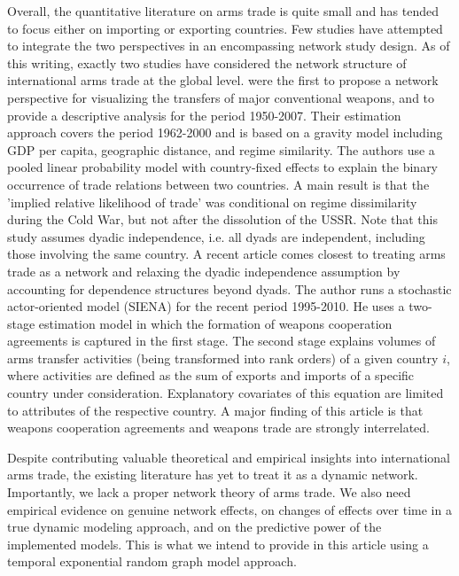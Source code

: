\documentclass[12pt, letterpaper]{article}
\numberwithin{equation}{section}
\begin{document}
Overall, the quantitative literature on arms trade is quite small and has tended to focus either on importing \citep{Pear:89, SmitTasi:05} or exporting \citep{Blan:05, PerkNeum:10} countries. Few studies have attempted to integrate the two perspectives in an encompassing network study design. 
As of this writing, exactly two studies have considered the network structure of international arms trade at the global level. 
\cite{AkerSeim:14} were the first to propose a network perspective for visualizing the transfers of major conventional weapons, and to provide a descriptive analysis for the period 1950-2007. 
Their estimation approach covers the period 1962-2000 and is based on a gravity model including GDP per capita, geographic distance, and regime similarity.
The authors use a pooled linear probability model with country-fixed effects to explain the binary occurrence of trade relations between two countries. A main result is that the 'implied relative likelihood of trade' was conditional on regime dissimilarity during the Cold War, but not after the dissolution of the USSR. Note that this study assumes dyadic independence, i.e. all dyads are independent, including those involving the same country. 
A recent article \citep{Kinne:2016} comes closest to treating arms trade as a network and relaxing the dyadic independence assumption by accounting for dependence structures beyond dyads. The author runs a stochastic actor-oriented model (SIENA) \citep{art:Snijders2002} for the recent period 1995-2010. He uses a two-stage estimation model in which the formation of weapons cooperation agreements is captured in the first stage. The second stage explains volumes of arms transfer activities (being transformed into rank orders) of a given country $i$, where activities are defined as the sum of exports and imports of a specific country under consideration. 
Explanatory covariates of this equation are limited to attributes of the respective country.  
A major finding of this article is that weapons cooperation agreements and weapons trade are strongly interrelated. 

Despite contributing valuable theoretical and empirical insights into international arms trade, the existing literature has yet to treat it as a dynamic network. Importantly, we lack a proper network theory of arms trade. We also need empirical evidence on genuine network effects, on changes of effects over time in a true dynamic modeling approach, and on the predictive power of the implemented models. This is what we intend to provide in this article using a temporal exponential random graph model approach.
\end{document}
